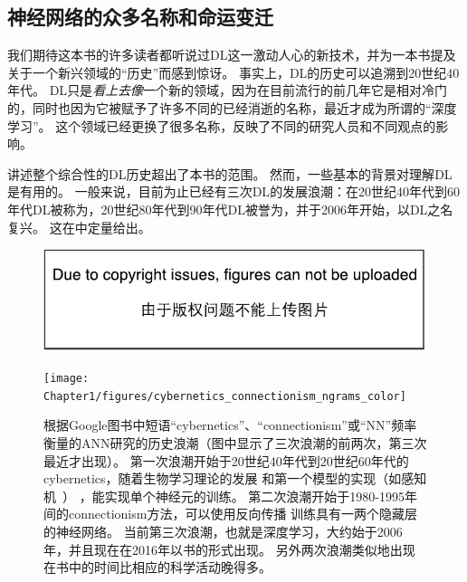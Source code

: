\subsection{神经网络的众多名称和命运变迁}
\label{sec:the_many_names_and_changing_fortunes_of_neural_networks}

我们期待这本书的许多读者都听说过\gls{DL}这一激动人心的新技术，并为一本书提及关于一个新兴领域的``历史''而感到惊讶。
事实上，\gls{DL}的历史可以追溯到20世纪40年代。
\gls{DL}只是\emph{看上去像}一个新的领域，因为在目前流行的前几年它是相对冷门的，同时也因为它被赋予了许多不同的已经消逝的名称，最近才成为所谓的``深度学习''。
这个领域已经更换了很多名称，反映了不同的研究人员和不同观点的影响。

讲述整个综合性的\gls{DL}历史超出了本书的范围。
然而，一些基本的背景对理解\gls{DL}是有用的。
一般来说，目前为止已经有三次\gls{DL}的发展浪潮：在20世纪40年代到60年代\gls{DL}被称为，20世纪80年代到90年代\gls{DL}被誉为，并于2006年开始，以\gls{DL}之名复兴。
这在中定量给出。
\begin{figure}[!htb]
\ifOpenSource
\centerline{\includegraphics{figure.pdf}}
\else
\centerline{\texttt{[image: Chapter1/figures/cybernetics\_connectionism\_ngrams\_color]}}
\fi
\caption{根据Google图书中短语``\gls{cybernetics}''、``\gls{connectionism}''或``\gls{NN}''频率衡量的\gls{ANN}研究的历史浪潮（图中显示了三次浪潮的前两次，第三次最近才出现）。
第一次浪潮开始于20世纪40年代到20世纪60年代的\gls{cybernetics}，随着生物学习理论的发展\citep{McCulloch43,Hebb49}
和第一个模型的实现（如感知机~\citep{Rosenblatt-1958}） ，能实现单个神经元的训练。
第二次浪潮开始于1980-1995年间的\gls{connectionism}方法，可以使用反向传播\citep{Rumelhart86b-small} 训练具有一两个隐藏层的神经网络。
当前第三次浪潮，也就是深度学习，大约始于2006年\citep{Hinton06,Bengio-nips-2006-small,ranzato-07-small}，并且现在在2016年以书的形式出现。
另外两次浪潮类似地出现在书中的时间比相应的科学活动晚得多。
}
\label{fig:chap1_cybernetics_connectionism_ngrams_color}
\end{figure}


